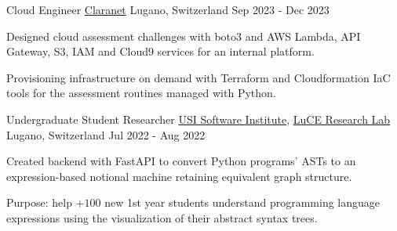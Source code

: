 \begin{cventries}
  \cventry
    {Cloud Engineer} %
    {\href{https://www.claranet.com}{Claranet}} %
    {Lugano, Switzerland} %
    {Sep 2023 - Dec 2023} %
    {
      \begin{cvitems} %
      \item {Designed cloud assessment challenges with boto3 and AWS 
      Lambda, API Gateway, S3, IAM and Cloud9 services 
      for an internal platform.}
      \item {Provisioning infrastructure on demand 
      with Terraform and Cloudformation IaC tools
      for the assessment routines managed with Python.}
      \end{cvitems}
    }
    
  \cventry
    {Undergraduate Student Researcher} %
    {
    \href{https://www.si.usi.ch/people}{USI Software Institute}, \href{https://luce.si.usi.ch/team/}{LuCE Research Lab}} %
    {Lugano, Switzerland} %
    {Jul 2022 - Aug 2022} %
    {
      \begin{cvitems} %
      \item {Created backend with FastAPI to convert Python programs' ASTs to
      an expression-based notional machine retaining equivalent graph structure.}
      \item{Purpose: help \( +100 \) new 1st year students 
      understand programming language expressions 
      using the visualization of their abstract syntax trees.%
      }
      \end{cvitems}
    }
    

\end{cventries}
